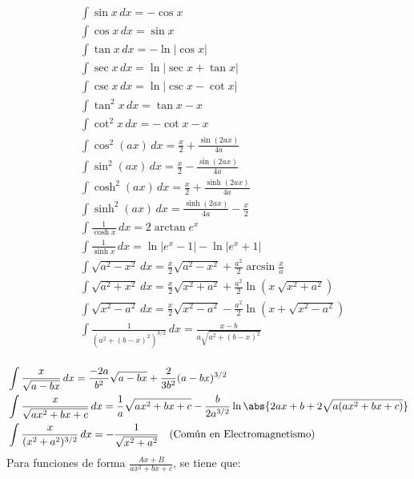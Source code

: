 \begin{minipage}{0.55\textwidth}
\begin{equation}
\begin{split}
    &\int \sin{x}\,dx = -\cos{x} \\
    &\int \cos{x}\,dx = \sin{x} \\
    &\int\tan{x}\,dx  = -\ln{|\cos{x}|} \\
    &\int\sec{x}\,dx  = \ln{|\sec{x}+\tan{x}|}\\
    &\int\csc{x}\,dx  = \ln{|\csc{x}-\cot{x}|}\\
    &\int\tan^2{x}\,dx  = \tan{x}-x \\
    &\int\cot^2{x}\,dx  = -\cot{x}-x \\
    &\int\cos^2{(ax)}\,dx  = \frac{x}{2}+\frac{\sin{(2ax)}}{4a}\\
    &\int\sin^2{(ax)}\,dx  = \frac{x}{2}-\frac{\sin{(2ax)}}{4a}\\
    &\int\cosh^2{(ax)}\,dx  = \frac{x}{2}+\frac{\sinh{(2ax)}}{4a}\\
    &\int\sinh^2{(ax)}\,dx  = \frac{\sinh{(2ax)}}{4a}-\frac{x}{2}\\
    &\int\frac{1}{\cosh{x}}\,dx  = 2\arctan{e^x}\\
    &\int\frac{1}{\sinh{x}}\,dx  = \ln{|e^x-1|}-\ln{|e^x+1|}\\
    &\int\sqrt{a^2-x^2}\,dx  = \frac{x}{2}\sqrt{a^2-x^2}+\frac{a^2}{2}\arcsin{\frac{x}{a}}\\
    &\int\sqrt{a^2+x^2}\,dx = \frac{x}{2}\sqrt{x^2+a^2}+\frac{a^2}{2}\ln{(x~\sqrt{x^2+a^2})}\\
    &\int\sqrt{x^2-a^2}\,dx = \frac{x}{2}\sqrt{x^2-a^2}-\frac{a^2}{2}\ln{(x+\sqrt{x^2-a^2})}\\
    &\int\frac{1}{(a^2+(b-x)^2)^{3/2}}\,dx=\frac{x-b}{a\sqrt{a^2+(b-x)^2}}\\
\end{split}
\nonumber
\end{equation}
\end{minipage}
\newpage
\begin{equation}
    \begin{split}
    &\int\frac{x}{\sqrt{a-bx}}\,dx= \frac{-2a}{b^2}\sqrt{a-bx}+\frac{2}{3b^2}(a-bx)^{3/2}\\
    &\int\frac{x}{\sqrt{ax^2 + bx +c}}\,dx = \frac{1}{a}\sqrt{ax^2 +bx +c} - \frac{b}{2a^{3/2}}\ln{\abs{2ax +b+2\sqrt{a(ax^2+bx+c)}}}\\
    &\int\frac{x}{(x^2+a^2)^{3/2}}\,dx = -\frac{1}{\sqrt{x^2 + a^2}} \quad \text{(Común en Electromagnetismo)}
    \end{split}
    \nonumber
\end{equation}
Para funciones de forma $\frac{Ax+B}{ax^2+bx+c}$, se tiene que:


